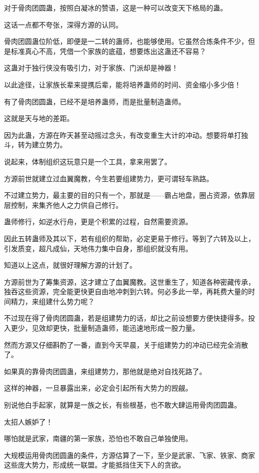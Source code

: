 \begin{this_body}
对于骨肉团圆蛊，按照白凝冰的赞语，这是一种可以改变天下格局的蛊。

这话一点都不夸张，深得方源的认同。

骨肉团圆蛊位阶低，即便是一二转的蛊师，也能够使用。它虽然合炼条件不少，但是标准真心不高，凭借一个家族的底蕴，想要炼出这蛊还不容易？

这蛊对于独行侠没有吸引力，对于家族、门派却是神器！

以此途径，让家族长辈来提携后辈，能将培养蛊师的时间、资金缩小多少倍！

有了骨肉团圆蛊，已经不是培养蛊师，而是批量制造蛊师。

这就是天与地的差距。

因为此蛊，方源在昨天甚至动摇过念头，有改变重生大计的冲动。想要将单打独斗，转为建立势力。

说起来，体制组织这玩意只是一个工具，拿来用罢了。

方源前世就建立过血翼魔教，今生若要组建势力，更可谓轻车熟路。

不过建立势力，最主要的目的只有一个，那就是——霸占地盘，圈占资源，依靠层层控制，来集齐他人之力供自己修行。

蛊师修行，如逆水行舟，更是个积累的过程，自然需要资源。

因此五转蛊师及其以下，若有组织的帮助，必定更易于修行。等到了六转及以上，引发质变，超凡成仙，天地伟力集中自身，那组织就没有用。

知道以上这点，就很好理解方源的计划了。

方源前世为了筹集资源，这才建立了血翼魔教。这世重生了，知道各种密藏传承，独吞这些资源，完全能更快更自由地冲刺到六转。何必多此一举，再耗费大量的时间精力，来组建什么势力呢？

不过现在得了骨肉团圆蛊，若是组建势力的话，却比之前设想要方便快捷得多。投入更少，见效却更快，批量制造蛊师，能迅速地形成一股力量。

然而方源又仔细斟酌了一番，直到今天早晨，关于组建势力的冲动已经完全消散了。

如果真的靠骨肉团圆蛊，来组建势力，那他就是绝对自找死路了。

这样的神器，一旦暴露出来，必定会引起所有大势力的觊觎。

别说他白手起家，就算是一族之长，有些根基，也不敢大肆运用骨肉团圆蛊。

太招人嫉妒了！

哪怕就是武家，南疆的第一家族，恐怕也不敢自己单独使用。

大规模运用骨肉团圆蛊的条件，方源估算了一下，至少是武家、飞家、铁家、商家这些庞大势力，形成统一联盟。才能抵挡住天下人的贪欲。


\end{this_body}

